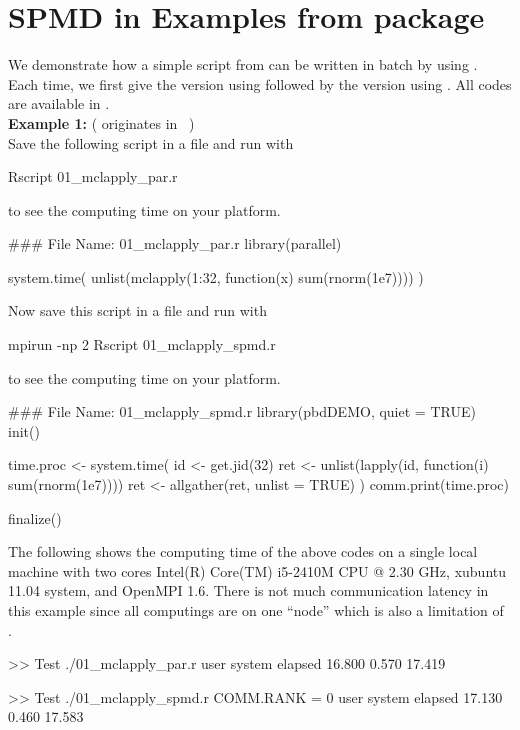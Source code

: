 
\section[SPMD in Examples from package \pkg{parallel}]{SPMD in Examples from package }
\label{sec:analog_examples}

We demonstrate how a simple script from  can be
written in batch by using .  Each time, we first give the
version using  followed by the
version using . All codes are available in
. \\

{\bf Example 1:}
( originates in ~\citep{Urbanek2011}) \\
Save the following script in a file and run with
\begin{Command}
Rscript 01_mclapply_par.r
\end{Command}
to see the computing time on your platform.
\begin{Code}[title=\pkg{multicore} R Script]
### File Name: 01_mclapply_par.r
library(parallel)

system.time(
  unlist(mclapply(1:32, function(x) sum(rnorm(1e7))))
)
\end{Code}
Now save this script in a file and run with
\begin{Command}
mpirun -np 2 Rscript 01_mclapply_spmd.r
\end{Command}
to see the computing time on your platform.
\begin{Code}[title=SPMD R Script]
### File Name: 01_mclapply_spmd.r
library(pbdDEMO, quiet = TRUE)
init()

time.proc <- system.time({
  id <- get.jid(32)
  ret <- unlist(lapply(id, function(i) sum(rnorm(1e7))))
  ret <- allgather(ret, unlist = TRUE)
})
comm.print(time.proc)

finalize()
\end{Code}

The following shows the computing time of the above codes
on a single local machine with two cores
Intel(R) Core(TM) i5-2410M CPU @ 2.30 GHz, xubuntu 11.04 system,
and OpenMPI 1.6. There is not much communication latency in this example
since all computings are on one ``node'' which is also
a limitation of .
\begin{CodeOutput}
>> Test ./01_mclapply_par.r
   user  system elapsed
 16.800   0.570  17.419

>> Test ./01_mclapply_spmd.r
COMM.RANK = 0
   user  system elapsed
 17.130   0.460  17.583
\end{CodeOutput}


